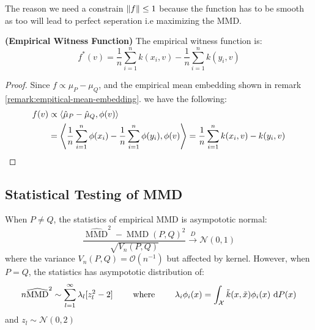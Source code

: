 \begin{remark}
    The reason we need a constrain $\left\lVert f\right\rVert\le1$ because the function has to be smooth as too  will lead to perfect seperation i.e maximizing the MMD.
\end{remark}

\begin{corollary}{\textbf{(Empirical Witness Function)}}
    The empirical witness function is:
    \begin{equation*}
        f^*(v) = \frac{1}{n}\sum^n_{i=1}k(x_i, v) - \frac{1}{n}\sum^n_{i=1}k(y_i, v)
    \end{equation*}
\end{corollary}
\begin{proof}
    Since $f \propto \mu_P-\mu_Q$, and the empirical mean embedding shown in remark \ref{remark:empitical-mean-embedding}.
    we have the following:
    \begin{equation*}
    \begin{aligned}
        f(v) &\propto \left\langle \hat{\mu}_P - \hat{\mu}_Q, \phi(v) \right\rangle \\ 
        &= \left\langle \frac{1}{n}\sum^n_{i=1}\phi(x_i) - \frac{1}{n}\sum^n_{i=1}\phi(y_i), \phi(v) \right\rangle = \frac{1}{n} \sum^n_{i=1} k(x_i, v) - k(y_i, v)
    \end{aligned}
    \end{equation*}
\end{proof}

\subsection{Statistical Testing of MMD}
\begin{theorem}
    When $P\ne Q$, the statistics of empirical MMD is asympototic normal:
    \begin{equation*}
        \frac{\widehat{\operatorname{MMD}}^2 - \operatorname{MMD}(P, Q)^2}{\sqrt{V_n(P, Q)}} \xrightarrow{D} \mathcal{N}(0, 1)
    \end{equation*}
    where the variance $V_n(P, Q) = \mathcal{O}(n^{-1})$ but affected by kernel. However, when $P=Q$, the statistics has asympototic distribution of:
    \begin{equation*}
        n\widehat{\operatorname{MMD}}^2 \sim \sum^\infty_{l=1} \lambda_l[z^2_l - 2] \qquad \text{ where } \qquad \lambda_i\phi_i(x) = \int_\mathcal{X}\tilde{k}(x,\tilde{x})\phi_i(x)\ \mathrm{d} P(x)
    \end{equation*}
    and $z_l\sim\mathcal{N}(0, 2)$
\end{theorem}

